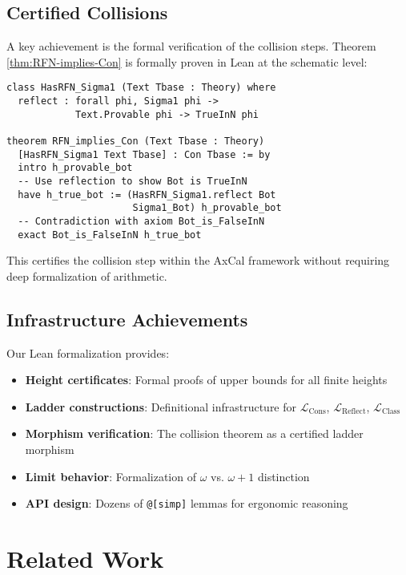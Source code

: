 \documentclass[11pt]{article}
\newcommand{\LCons}{\mathcal{L}_{\mathrm{Cons}}}
\newcommand{\LReflect}{\mathcal{L}_{\mathrm{Reflect}}}
\newcommand{\LClass}{\mathcal{L}_{\mathrm{Class}}}
\begin{document}
\subsection{Certified Collisions}
A key achievement is the formal verification of the collision steps. Theorem \ref{thm:RFN-implies-Con} is formally proven in Lean at the schematic level:

\begin{lstlisting}[language=Lean, caption={Schematic Proof of RFN implies Con}]
class HasRFN_Sigma1 (Text Tbase : Theory) where
  reflect : forall phi, Sigma1 phi -> 
            Text.Provable phi -> TrueInN phi

theorem RFN_implies_Con (Text Tbase : Theory) 
  [HasRFN_Sigma1 Text Tbase] : Con Tbase := by
  intro h_provable_bot
  -- Use reflection to show Bot is TrueInN
  have h_true_bot := (HasRFN_Sigma1.reflect Bot 
                      Sigma1_Bot) h_provable_bot
  -- Contradiction with axiom Bot_is_FalseInN
  exact Bot_is_FalseInN h_true_bot
\end{lstlisting}

This certifies the collision step within the AxCal framework without requiring deep formalization of arithmetic.

\subsection{Infrastructure Achievements}
Our Lean formalization provides:
\begin{itemize}
\item \textbf{Height certificates}: Formal proofs of upper bounds for all finite heights
\item \textbf{Ladder constructions}: Definitional infrastructure for $\LCons$, $\LReflect$, $\LClass$
\item \textbf{Morphism verification}: The collision theorem as a certified ladder morphism
\item \textbf{Limit behavior}: Formalization of $\omega$ vs. $\omega+1$ distinction
\item \textbf{API design}: Dozens of \texttt{@[simp]} lemmas for ergonomic reasoning
\end{itemize}

\section{Related Work}
\end{document}
